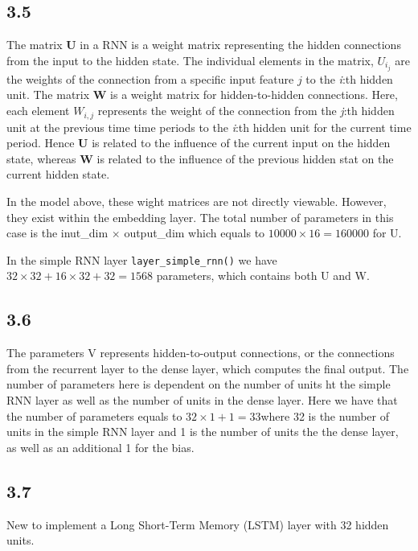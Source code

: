 \documentclass[10pt, a4paper, english]{article}\usepackage[]{graphicx}\usepackage[dvipsnames]{xcolor}
\begin{document}
\subsection{3.5}
The matrix \textbf{U} in a RNN is a weight matrix representing the hidden connections from the input to the hidden state. The individual elements in the matrix, $U_{i_j}$ are the weights of the connection from a specific input feature $j$  to the \emph{i}:th hidden unit.   The matrix \textbf{W} is a weight matrix  for hidden-to-hidden connections. Here, each element $W_{i,j}$ represents the weight of the connection from the \emph{j}:th hidden unit at the previous time time periods to the \emph{i}:th hidden unit for the current time period. Hence \textbf{U} is related to the influence of the current input on the hidden state, whereas \textbf{W} is related to the influence of the previous hidden stat on the current hidden state. 


In the model above, these wight matrices are not directly viewable. However, they exist within the embedding layer. The total number of parameters in this case is the inut\_dim $\times$ output\_dim which equals to $10000 \times 16 = 160000$ for U. 

In the simple RNN layer \texttt{layer\_simple\_rnn()} we have $32 \times 32 + 16 \times 32 + 32 = 1568$ parameters, which contains both U and W.  


\subsection{3.6}
The parameters V represents hidden-to-output connections, or the connections from the recurrent layer to the dense layer, which computes the final output. The number of parameters here is dependent on the number of units ht the simple RNN layer as well as the number of units in the dense layer. Here we have that the number of parameters equals to $32 \times 1 + 1 = 33$where 32 is the number of units in the simple RNN layer and 1 is the number of units the the dense layer, as well as an additional 1 for the bias. 

\subsection{3.7}
New to implement a Long Short-Term Memory (LSTM) layer with 32 hidden units. 
\end{document}
